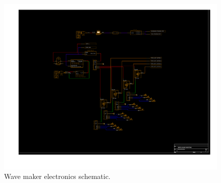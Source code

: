 \documentclass[hardware,article,submit,pdftex,moreauthors]{Definitions/mdpi}
\begin{document}
\begin{landscape}
\begin{figure}[tb]
	\centering
	\includegraphics[height=0.95\textwidth, width=\linewidth]{diagrams/SIWEED_ElecDrawings_and_UpdatedBOM/PDFs/siweed_electronics_aux_subsystems.pdf}
	\caption{Wave maker electronics schematic.}
	\label{fig:siweed_electronics_aux_subsystems}
\end{figure}
\end{landscape}




\begin{landscape}
\begingroup
\footnotesize
\renewcommand{\dtldisplaystarttab}{\hline}%
\renewcommand\dtldisplayafterhead{\hline}%
\renewcommand\dtldisplaystartrow{\hline}%

\end{landscape}
\endgroup



\end{document}

